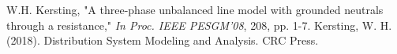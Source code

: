 \documentclass[12pt]{article}
\begin{document}
\begin{thebibliography}{100}

 W.H. Kersting, "A three-phase unbalanced line model with grounded neutrals through a resistance,"  \textit{In Proc.  IEEE PESGM'08}, 208, pp.  1-7.
 Kersting, W. H. (2018). Distribution System Modeling and Analysis. CRC Press.
\end{thebibliography}
\end{document}
